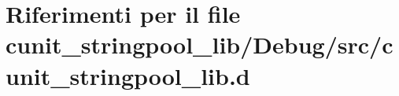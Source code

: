 \hypertarget{cunit__stringpool__lib_8d}{
\section{Riferimenti per il file cunit\_\-stringpool\_\-lib/Debug/src/cunit\_\-stringpool\_\-lib.d}
\label{cunit__stringpool__lib_8d}
}
